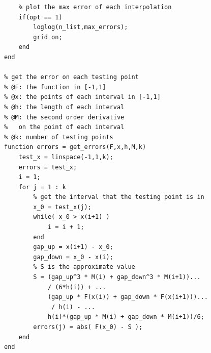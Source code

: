 \documentclass[12pt,a4paper,utf8]{ctexart}
\begin{document}
\begin{enumerate}
\begin{itemize}
\begin{lstlisting}[frame=single]
    % for opt = 1,
    % plot the max error of each interpolation
    if(opt == 1)
        loglog(n_list,max_errors);
        grid on;
    end
end

% get the error on each testing point
% @F: the function in [-1,1]
% @x: the points of each interval in [-1,1]
% @h: the length of each interval
% @M: the second order derivative
%   on the point of each interval
% @k: number of testing points
function errors = get_errors(F,x,h,M,k)
    test_x = linspace(-1,1,k);
    errors = test_x;
    i = 1;
    for j = 1 : k
        % get the interval that the testing point is in
        x_0 = test_x(j);
        while( x_0 > x(i+1) )
            i = i + 1;
        end
        gap_up = x(i+1) - x_0;
        gap_down = x_0 - x(i);
        % S is the approximate value
        S = (gap_up^3 * M(i) + gap_down^3 * M(i+1))...
            / (6*h(i)) + ...
            (gap_up * F(x(i)) + gap_down * F(x(i+1)))...
             / h(i) - ...
            h(i)*(gap_up * M(i) + gap_down * M(i+1))/6;
        errors(j) = abs( F(x_0) - S );
    end
end
      
    \end{lstlisting}


\end{itemize}
\end{enumerate}
\end{document}
